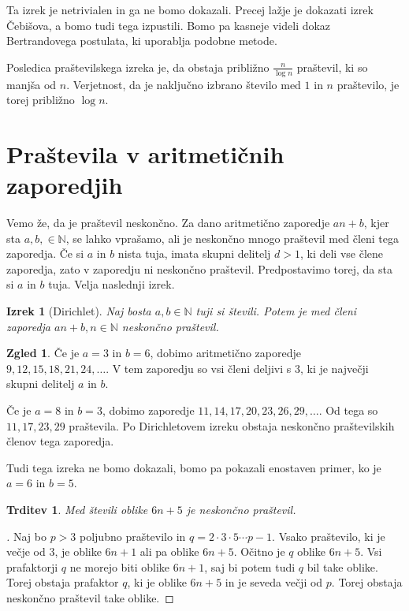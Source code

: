 \documentclass[a4paper,12pt]{article}
\def\N{\mathbb{N}}
\theoremstyle{definition}
\newtheorem{zgled}{Zgled}
\theoremstyle{plain}
\newtheorem{izrek}{Izrek}
\newtheorem{trditev}{Trditev}
\newenvironment{dokaz}{\begin{proof}[\bfseries\upshape\proofname]}{\end{proof}}
\begin{document}
Ta izrek je netrivialen in ga ne bomo dokazali. Precej lažje je dokazati izrek Čebišova, a bomo tudi tega izpustili. Bomo pa kasneje videli dokaz Bertrandovega postulata, ki uporablja podobne metode.

Posledica praštevilskega izreka je, da obstaja približno $\frac{n}{\log{n}}$ praštevil, ki so manjša od $n$. Verjetnost, da je naključno izbrano število med $1$ in $n$ praštevilo, je torej približno $\log{n}$.




\section{Praštevila v aritmetičnih zaporedjih}
Vemo že, da je praštevil neskončno. Za dano aritmetično zaporedje $an + b$, kjer sta $a, b, \in \N$, se lahko vprašamo, ali je neskončno mnogo praštevil med členi tega zaporedja. Če si $a$ in $b$ nista tuja, imata skupni delitelj $d > 1$, ki deli vse člene zaporedja, zato v zaporedju ni neskončno praštevil. Predpostavimo torej, da sta si $a$ in $b$ tuja. Velja naslednji izrek.

\begin{izrek}[Dirichlet]
    Naj bosta $a, b \in \N$ tuji si števili. Potem je med členi zaporedja $an + b, n \in \N$ neskončno praštevil.
\end{izrek}

\begin{zgled}
    Če je $a = 3$ in $b = 6$, dobimo aritmetično zaporedje $9, 12, 15, 18, 21, 24, \ldots$. V tem zaporedju so vsi členi deljivi s $3$, ki je največji skupni delitelj $a$ in $b$.
    
    Če je $a = 8$ in $b = 3$, dobimo zaporedje $11, 14, 17, 20, 23, 26, 29, \ldots$. Od tega so $11, 17, 23, 29$ praštevila. Po Dirichletovem izreku obstaja neskončno praštevilskih členov tega zaporedja.
\end{zgled}

Tudi tega izreka ne bomo dokazali, bomo pa pokazali enostaven primer, ko je $a = 6$ in $b = 5$.

\begin{trditev}
    Med števili oblike $6n + 5$ je neskončno praštevil.
\end{trditev}
\begin{dokaz}
    Naj bo $p > 3$ poljubno praštevilo in $q = 2 \cdot 3 \cdot 5 \cdots p - 1$. Vsako praštevilo, ki je večje od $3$, je oblike $6n + 1$ ali pa oblike $6n + 5$. Očitno je $q$ oblike $6n + 5$. Vsi prafaktorji $q$ ne morejo biti oblike $6n + 1$, saj bi potem tudi $q$ bil take oblike. Torej obstaja prafaktor $q$, ki je oblike $6n + 5$ in je seveda večji od $p$. Torej obstaja neskončno praštevil take oblike.
\end{dokaz}
\end{document}
